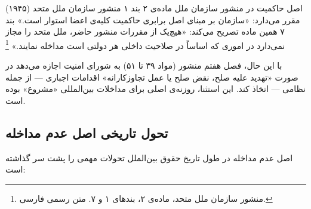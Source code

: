 \begin{legalNote}{اصل حاکمیت در منشور سازمان ملل}
ماده‌ی ۲ بند ۱ منشور سازمان ملل متحد (۱۹۴۵) مقرر می‌دارد: «سازمان بر مبنای اصل برابری حاکمیت کلیه‌ی اعضا استوار است.» بند ۷ همین ماده تصریح می‌کند: «هیچ‌یک از مقررات منشور حاضر، ملل متحد را مجاز نمی‌دارد در اموری که اساساً در صلاحیت داخلی هر دولتی است مداخله نمایند.»%
\footnote{منشور سازمان ملل متحد، ماده‌ی ۲، بندهای ۱ و ۷. متن رسمی فارسی.}

با این حال، فصل هفتم منشور (مواد ۳۹ تا ۵۱) به شورای امنیت اجازه می‌دهد در صورت «تهدید علیه صلح، نقض صلح یا عمل تجاوزکارانه» اقدامات اجباری — از جمله نظامی — اتخاذ کند. این استثنا، روزنه‌ی اصلی برای مداخلات بین‌المللی «مشروع» بوده است.
\end{legalNote}

\subsection{تحول تاریخی اصل عدم مداخله}
\label{subsec:ch02-evolution}

اصل عدم مداخله در طول تاریخ حقوق بین‌الملل تحولات مهمی را پشت سر گذاشته است:


